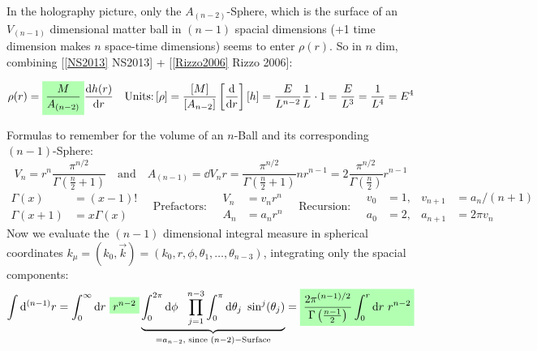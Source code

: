 \documentclass[10pt,a4paper, fleqn]{article}
\newcommand{\highlight}[1]{%
  \colorbox{green!30}{$\displaystyle#1$}}
\begin{document}
In the holography picture, only the $A_{(n-2)}$-Sphere, which is the surface of an $V_{(n-1)}$ dimensional matter ball in $(n-1)$ spacial dimensions (+1 time dimension makes $n$ space-time dimensions) seems to enter $\rho(r)$. So in $n$ dim, combining [\ref{NS2013} NS2013] + [\ref{Rizzo2006} Rizzo 2006]:

\begin{equation}
\rho(r) = \highlight{ \frac{M}{A_{(n-2)}}} \dd{h(r)}{r}
\quad \text{Units:} \left[ \rho \right] = \frac{[M]}{[A_{n-2}]} \left[ \dd{}{r}\right] [h] = \frac{E}{L^{n-2}} \frac{1}{L} \cdot 1 = \frac{E}{L^3} = \frac{1}{L^4} = E^4
\end{equation}

Formulas to remember for the volume of an $n$-Ball and its corresponding $(n-1)$-Sphere:
%
\begin{equation}
V_n = r^n \frac{\pi^{n/2}}{\Gamma\left( \frac{n}{2} + 1\right)}
\quad\text{and}\quad
A_{(n-1)} = \dd{V_n}{r} = \frac{\pi^{n/2}}{\Gamma\left(\frac{n}{2}+1\right)} n r^{n-1}
= 2 \frac{\pi^{n/2}}{\Gamma\left(\frac{n}{2}\right)} r^{n-1}
\end{equation}
\begin{equation}
\begin{aligned}
\Gamma(x) &= (x-1)! \\
\Gamma(x+1) &= x \Gamma(x)
\end{aligned}\quad
\text{Prefactors:}\quad 
\begin{aligned}
V_n &=v_n r^n \\
A_n &= a_n r^n
\end{aligned} \quad \text{Recursion:}\quad
\begin{aligned}
v_0 &= 1, &v_{n+1} &= a_n / (n+1) \\
a_0 &= 2, &a_{n+1} &= 2\pi v_n
\end{aligned}
\end{equation}
%
Now we evaluate the $(n-1)$ dimensional integral measure in spherical coordinates $k_\mu = (k_0, \vec{k}) = (k_0, r, \phi, \theta_1, \dots, \theta_{n-3})$, integrating only the spacial components:
%
\begin{equation} \label{nrad}
\int \d^{(n-1)}r = \int_0^\infty \d r ~ \highlight{r^{n-2}} \underbrace{\int_0^{2\pi} \d \phi ~~  \prod_{j=1}^{n-3} \int_0^\pi \d \theta_j ~ \sin^j(\theta_j)}_{=a_{n-2}\text{, since }(n-2)-\text{Surface}}
= \highlight{ \frac{2 \pi^{(n-1)/2}}{\Gamma\left(\frac{n-1}{2}\right)} \int_0^r \d r ~r^{n-2} }
\end{equation}
\end{document}
